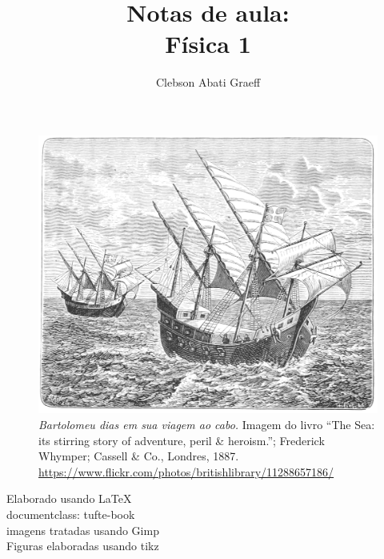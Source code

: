 \documentclass[justified,a4paper,symmetric,nobib]{tufte-book}
\title{Notas de aula: \\ Física 1}
\author{Clebson Abati Graeff}
\begin{document}


\mainmatter

%
%









\printbibliography

\cleardoublepage
\thispagestyle{empty}
\begin{figure}
\centering
\includegraphics{Fig/Caravelas.png}
\caption{\emph{Bartolomeu dias em sua viagem ao cabo.} Imagem do livro ``The Sea: its stirring story of adventure, peril \& heroism.''; Frederick Whymper; Cassell \& Co., Londres, 1887. \url{https://www.flickr.com/photos/britishlibrary/11288657186/}}
\end{figure}
\vfill
\begin{fullwidth}
\begin{center}\sc
Elaborado usando \LaTeX \\
documentclass: tufte-book \\
imagens tratadas usando Gimp \\
Figuras elaboradas usando tikz
\end{center}
\end{fullwidth}
\end{document}
